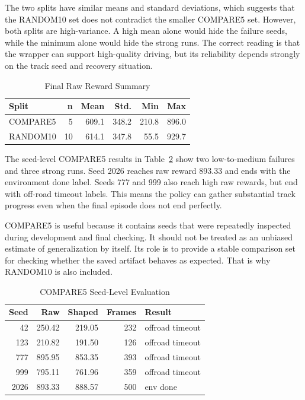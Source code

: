 \documentclass[conference]{IEEEtran}
\begin{document}
The two splits have similar means and standard deviations, which suggests that the RANDOM10 set does not contradict the smaller COMPARE5 set. However, both splits are high-variance. A high mean alone would hide the failure seeds, while the minimum alone would hide the strong runs. The correct reading is that the wrapper can support high-quality driving, but its reliability depends strongly on the track seed and recovery situation.

\begin{table}[t]
\caption{Final Raw Reward Summary}
\label{tab:summary}
\centering
\scriptsize
\begin{tabular}{lrrrrr}
\toprule
Split & n & Mean & Std. & Min & Max \\
\midrule
COMPARE5 & 5 & 609.1 & 348.2 & 210.8 & 896.0 \\
RANDOM10 & 10 & 614.1 & 347.8 & 55.5 & 929.7 \\
\bottomrule
\end{tabular}
\end{table}

The seed-level COMPARE5 results in Table~\ref{tab:compare5} show two low-to-medium failures and three strong runs. Seed 2026 reaches raw reward 893.33 and ends with the environment done label. Seeds 777 and 999 also reach high raw rewards, but end with off-road timeout labels. This means the policy can gather substantial track progress even when the final episode does not end perfectly.

COMPARE5 is useful because it contains seeds that were repeatedly inspected during development and final checking. It should not be treated as an unbiased estimate of generalization by itself. Its role is to provide a stable comparison set for checking whether the saved artifact behaves as expected. That is why RANDOM10 is also included.

\begin{table}[t]
\caption{COMPARE5 Seed-Level Evaluation}
\label{tab:compare5}
\centering
\scriptsize
\begin{tabular}{rrrrl}
\toprule
Seed & Raw & Shaped & Frames & Result \\
\midrule
42 & 250.42 & 219.05 & 232 & offroad timeout \\
123 & 210.82 & 191.50 & 126 & offroad timeout \\
777 & 895.95 & 853.35 & 393 & offroad timeout \\
999 & 795.11 & 761.96 & 359 & offroad timeout \\
2026 & 893.33 & 888.57 & 500 & env done \\
\bottomrule
\end{tabular}
\end{table}
\end{document}
